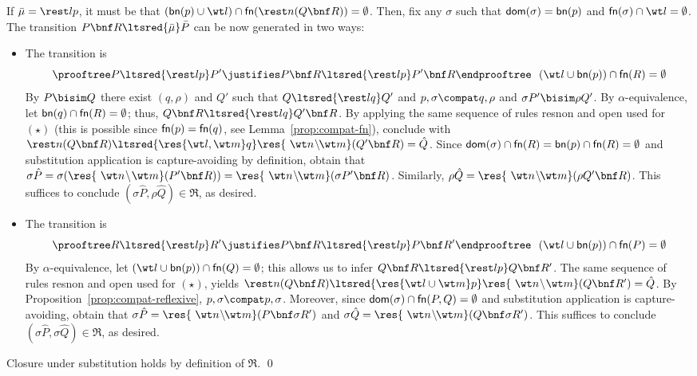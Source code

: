 \documentclass{LMCS}
\newcommand{\withsetnot}[2]{#2}
\begin{document}
\noindent If $\bar\mu = \rest l p$, it must be that $({\sf bn}(p) \cup \wt l) \cap {\sf fn}(\rest n(Q\bnf R)) = \emptyset$.
Then, fix any $\sigma$ such that ${\sf dom}(\sigma) = {\sf bn}(p)$ and ${\sf fn}(\sigma) \cap \wt l = \emptyset$.
The transition $P\bnf R \ltsred{\bar\mu} \bar P$ can be now generated in two ways:
\begin{itemize}
\item The transition is
	\begin{equation*}
	\prooftree P\ltsred{\rest l p} P'
	\justifies P\bnf R\ltsred{\rest l p} P'\bnf R
	\endprooftree
	\ \ (\wt l \cup {\sf bn}(p)) \cap {\sf fn}(R) = \emptyset
	\end{equation*}
	By $P\bisim Q$ there exist $(q,\rho)$ and $Q'$ such that $Q\ltsred{\rest l q} Q'$ and
	$p,\sigma \compat q,\rho$ and $\sigma P' \bisim \rho Q'$. By $\alpha$-equivalence,
	let ${\sf bn}(q) \cap {\sf fn}(R) = \emptyset$; thus, $Q \bnf R \ltsred{\rest l q} Q' \bnf R$.
	By applying the same sequence of rules {\sf resnon} and {\sf open} used for $(\star)$
	(this is possible since ${\sf fn}(p) = {\sf fn}(q)$, see Lemma~\ref{prop:compat-fn}), 
	conclude with $\rest n (Q\bnf R) \ltsred{\res{\wt l,\wt m} q} \res{\ \wt n\! \setminus\!\! \wt m}(Q'\bnf R)
	= \hat Q$.
	Since ${\sf dom}(\sigma) \cap {\sf fn}(R) = {\sf bn}(p) \cap {\sf fn}(R) = \emptyset$ and
	substitution application is capture-avoiding by definition, obtain that $\sigma\hat P = 
	\sigma(\res{\ \wt n\! \setminus\! \wt m}(P'\bnf R)) = 
	\res{\ \wt n\! \setminus\!\! \wt m}(\sigma P'\bnf R)$.
	Similarly, $\rho\hat Q = \res{\ \wt n\! \setminus\!\! \wt m}(\rho Q' \bnf R)$.
	This suffices to conclude $(\sigma\hat P,\rho\hat Q) \in \Re$, as desired.
\item The transition is
	\begin{equation*}
	\prooftree R\ltsred{\rest l p} R'
	\justifies P\bnf R\ltsred{\rest l p} P\bnf R'
	\endprooftree
	\ \ (\wt l \cup {\sf bn}(p)) \cap {\sf fn}(P) = \emptyset
	\end{equation*}
	By $\alpha$-equivalence, let $(\wt l \cup {\sf bn}(p)) \cap {\sf fn}(Q) = \emptyset$;
	this allows us to infer $Q\bnf R\ltsred{\rest l p} Q\bnf R'$. The same sequence of
	rules {\sf resnon} and {\sf open} used for $(\star)$, yields
	$\rest n (Q\bnf R) \ltsred{\res{\withsetnot{\wt l,\wt m}{\wt l\cup\wt m}} p}
    \res{\ \wt n\! \setminus\! \wt m}(Q\bnf R') = \hat Q$.
	By Proposition~\ref{prop:compat-reflexive}, $p,\sigma \compat p,\sigma$. Moreover, 
	since ${\sf dom}(\sigma) \cap {\sf fn}(P,Q) = \emptyset$ and
	substitution application is capture-avoiding, obtain that $\sigma\hat P = 
	\res{\ \wt n\! \setminus\!\! \wt m}(P\bnf \sigma R')$ and
	$\sigma\hat Q = \res{\ \wt n\! \setminus\!\! \wt m}(Q \bnf \sigma R')$.
	This suffices to conclude $(\sigma\hat P,\sigma\hat Q) \in \Re$, as desired.
\end{itemize}
Closure under substitution holds by definition of $\Re$.
\qed
\end{document}
